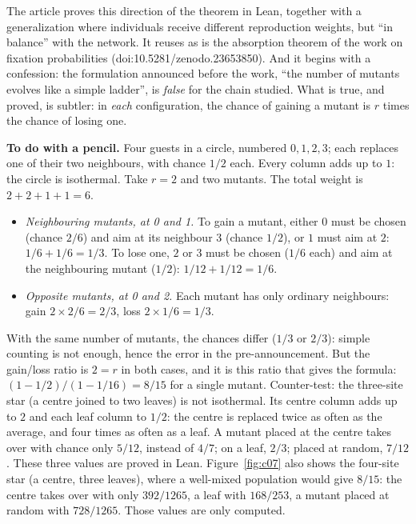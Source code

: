 The article proves this direction of the theorem in Lean, together with a generalization where individuals receive
different reproduction weights, but ``in balance'' with the network. It reuses as is the absorption theorem of the
work on fixation probabilities (doi:10.5281/zenodo.23653850). And it begins with a confession: the formulation
announced before the work, ``the number of mutants evolves like a simple ladder'', is \emph{false} for the chain
studied. What is true, and proved, is subtler: in \emph{each} configuration, the chance of gaining a mutant is $r$
times the chance of losing one.

\begin{encadre}
\textbf{To do with a pencil.} Four guests in a circle, numbered $0,1,2,3$; each replaces one of their two
neighbours, with chance $1/2$ each. Every column adds up to $1$: the circle is isothermal. Take $r=2$ and two
mutants. The total weight is $2+2+1+1=6$.
\begin{itemize}
\item \emph{Neighbouring mutants, at 0 and 1.} To gain a mutant, either $0$ must be chosen (chance $2/6$) and aim
  at its neighbour $3$ (chance $1/2$), or $1$ must aim at $2$: $1/6+1/6=1/3$. To lose one, $2$ or $3$ must be
  chosen ($1/6$ each) and aim at the neighbouring mutant ($1/2$): $1/12+1/12=1/6$.
\item \emph{Opposite mutants, at 0 and 2.} Each mutant has only ordinary neighbours: gain $2\times2/6=2/3$,
  loss $2\times1/6=1/3$.
\end{itemize}
With the same number of mutants, the chances differ ($1/3$ or $2/3$): simple counting is not enough, hence the
error in the pre-announcement. But the gain/loss ratio is $2=r$ in both cases, and it is this ratio that gives
the formula: $(1-1/2)/(1-1/16)=8/15$ for a single mutant. Counter-test: the three-site star (a centre joined to
two leaves) is not isothermal. Its centre column adds up to $2$ and each leaf column to $1/2$: the centre is
replaced twice as often as the average, and four times as often as a leaf. A mutant placed at the centre takes
over with chance only $5/12$, instead of $4/7$; on a leaf, $2/3$; placed at random, $7/12$. These three values
are proved in Lean. Figure~\ref{fig:c07} also shows the four-site star (a centre, three leaves), where a
well-mixed population would give $8/15$: the centre takes over with only $392/1265$, a leaf with $168/253$, a
mutant placed at random with $728/1265$. Those values are only computed.
\end{encadre}

